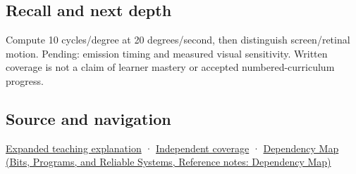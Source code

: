 \subsection{Recall and next depth}\label{appendix-70895739febb-recall-and-next-depth}

Compute 10 cycles/degree at 20 degrees/second, then distinguish screen/retinal motion. Pending: emission timing and measured visual sensitivity. Written coverage is not a claim of learner mastery or accepted numbered-curriculum progress.

\subsection{Source and navigation}\label{appendix-70895739febb-source-and-navigation}

\hyperref[04-visual-computing-ii-ch042-a-gaze-sample-needs-a-time-as-well-as-a-direction]{Expanded teaching explanation} · \hyperref[appendix-fd090d982a15-xr01---independent-seeing-and-representation-source]{Independent coverage} · \href{../01-Bits-Programs-and-Reliable-Systems/main.pdf\#nameddest=appendix-4ad47bdd269a}{Dependency Map (Bits, Programs, and Reliable Systems, Reference notes: Dependency Map)}
